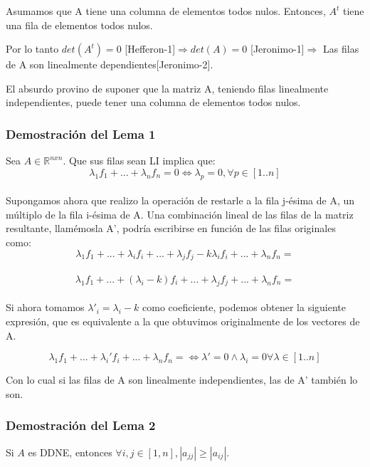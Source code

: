 Asumamos que A tiene una columna de elementos todos nulos. Entonces, $A^{t}$ tiene una fila de elementos todos nulos.

Por lo tanto $det( A^{t}) = 0$ [Hefferon-1]$\Rightarrow det(A) = 0$ [Jeronimo-1]$\Rightarrow$ Las filas de A son linealmente dependientes[Jeronimo-2]. 

El absurdo provino de suponer que la matriz A, teniendo filas linealmente independientes, puede tener una columna de elementos todos nulos.
\subsubsection{Demostración del Lema 1}
Sea $A \in \mathbb{R}^{nxn}$. Que sus filas sean LI implica que:
\begin{equation} 
\lambda_{1} f_{1} + ... + \lambda_{n}f_{n}  = 0 \Leftrightarrow \lambda_{p} = 0,  \forall p \in [1..n]
\end{equation} 
\\
Supongamos ahora que realizo la operación de restarle a la fila j-ésima de A, un m\'ultiplo de la fila i-ésima de A. Una combinación lineal de las filas de la matriz resultante, llam\'emosla A', podr\'ia escribirse en función de las filas originales como:
\\
\begin{equation} 
\lambda_{1} f_{1} + ... + \lambda_{i} f_{i} + ... + \lambda_{j} f_{j} - k  \lambda_{i} f_{i} + ... + \lambda_{n}f_{n}  =
\end{equation} 
\\
\begin{equation} 
\lambda_{1} f_{1} + ... + ( \lambda_{i} - k) f_{i} + ... + \lambda_{j} f_{j} + ... + \lambda_{n}f_{n}  =
\end{equation} 
\\
Si ahora tomamos $ \lambda'_{i} = \lambda_{i} - k $ como coeficiente, podemos obtener la siguiente expresi\'on, que es equivalente a la que obtuvimos originalmente de los vectores de A. 

\begin{equation} 
\lambda_{1} f_{1} + ... +  \lambda_{i}' f_{i} + ... + \lambda_{n}f_{n} =  \Leftrightarrow \lambda' = 0 \wedge  \lambda_{i} = 0 \forall \lambda \in [1 .. n]
\end{equation} 

Con lo cual si las filas de A son linealmente independientes,  las de A' tambi\'en lo son.
\subsubsection{Demostración del Lema 2}
Si $A$ es DDNE, entonces $\forall i, j \in [1, n], |a_{jj}| \geq|a_{ij}|$.

